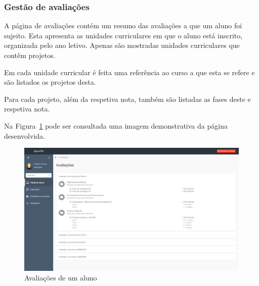 \subsubsection{Gestão de avaliações}

A página de avaliações contém um resumo das avaliações a que um aluno foi sujeito. Esta apresenta as unidades curriculares em que o aluno está inscrito, organizada pelo ano letivo. Apenas são mostradas unidades curriculares que contêm projetos.

Em cada unidade curricular é feita uma referência ao curso a que esta se refere e são listados os projetos desta.

Para cada projeto, além da respetiva nota, também são listadas as fases deste e respetiva nota.

Na Figura~\ref{fig:student_grades} pode ser consultada uma imagem demonstrativa da página desenvolvida.

\begin{figure}[H]
  \centering
  \includegraphics[width=1\textwidth,center]{images/implementacao/alunos/grades}
  \caption{Avaliações de um aluno}
  \label{fig:student_grades}
\end{figure}
